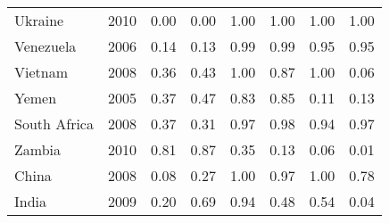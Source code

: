\begin{longtable}[t]{lrrrrrrr}
Ukraine & 2010 & 0.00 & 0.00 & 1.00 & 1.00 & 1.00 & 1.00\\
Venezuela & 2006 & 0.14 & 0.13 & 0.99 & 0.99 & 0.95 & 0.95\\
Vietnam & 2008 & 0.36 & 0.43 & 1.00 & 0.87 & 1.00 & 0.06\\
Yemen & 2005 & 0.37 & 0.47 & 0.83 & 0.85 & 0.11 & 0.13\\
South Africa & 2008 & 0.37 & 0.31 & 0.97 & 0.98 & 0.94 & 0.97\\
Zambia & 2010 & 0.81 & 0.87 & 0.35 & 0.13 & 0.06 & 0.01\\
China & 2008 & 0.08 & 0.27 & 1.00 & 0.97 & 1.00 & 0.78\\
India & 2009 & 0.20 & 0.69 & 0.94 & 0.48 & 0.54 & 0.04\\
\bottomrule
\end{longtable}